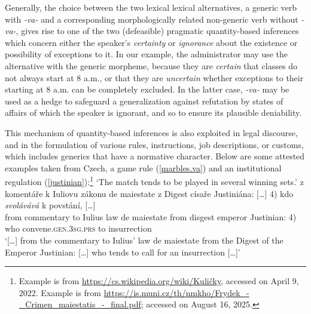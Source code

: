 \documentclass[output=paper,colorlinks,citecolor=brown]{langscibook}
\begin{document}
Generally, the choice between the two lexical
lexical alternatives, a generic verb with \textit{-va-} and a corresponding morphologically related non-generic verb without \textit{-va-},
gives rise to one of the two
(defeasible) pragmatic quantity-based inferences which concern either the speaker's \textit{certainty} or \textit{ignorance}
about the existence or possibility of exceptions to it.
In our example, the administrator may use the alternative with the generic morpheme, because they are \textit{certain} that
classes do not always start at 8 a.m.,
or that they are \textit{uncertain} whether exceptions to their starting at 8 a.m.
can be completely excluded.
In the latter case, \textit{-va-} may be used as a hedge to safeguard a generalization against refutation by states of affairs
of which the speaker is ignorant, and so to ensure its plausible deniability.

This mechanism of quantity-based inferences is also exploited in legal discourse,
and in the formulation of various rules, instructions, job descriptions, or customs, which includes generics that have a normative character.
Below are some attested examples taken from Czech,
a game rule (\ref{marbles.va}) and an institutional regulation (\ref{justinian}):\footnote{Example  is from \url{https://cs.wikipedia.org/wiki/Kuličky}, accessed on April 9, 2022. Example  is from \url{https://is.muni.cz/th/nmkho/Frydek_-_Crimen_maiestatis_-_final.pdf};
accessed on August 16, 2025.}
\ea
{}
\glt `The match tends to be played in several winning sets.'
\ex \label{justinian}
\gll {[\dots]} z komentáře k Iuliovu zákonu de maiestate z Digest císaře Justiniána: [\dots] 4) kdo \textit{svolávává} k {povstání, {[\dots]}}  \\
{} from commentary to Iulius law de maiestate from disgest emperor Justinian: {} 4) who convene.\textsc{gen.3\textsc{sg.prs}} to insurrection\\
\glt `[\dots] from the commentary to Iulius' law de maiestate from the Digest of the Emperor Justinian: [\dots] who tends to call for an insurrection [\dots]'
\z
\z




\end{document}
